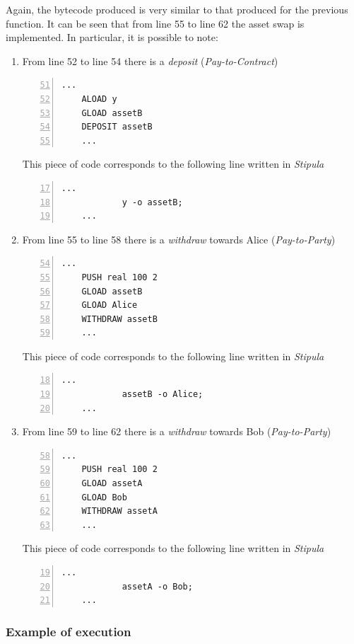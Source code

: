 Again, the bytecode produced is very similar to that produced for the previous function. It can be seen 
that from line 55 to line 62 the asset swap is implemented. In particular, it is possible to note:
\begin{enumerate}
  \item From line 52 to line 54 there is a \textit{deposit} (\textit{Pay-to-Contract})
  \begin{Verbatim}[numbers=left,xleftmargin=1cm,firstnumber=51,tabsize=2]
    ...
    ALOAD y
    GLOAD assetB
    DEPOSIT assetB
    ...
  \end{Verbatim}
  This piece of code corresponds to the following line written in \textit{Stipula}
  \begin{Verbatim}[numbers=left,xleftmargin=1cm,firstnumber=17,tabsize=2]
    ...
            y -o assetB;
    ...
  \end{Verbatim}
  \item From line 55 to line 58 there is a \textit{withdraw} towards Alice (\textit{Pay-to-Party})
  \begin{Verbatim}[numbers=left,xleftmargin=1cm,firstnumber=54,tabsize=2]
    ...
    PUSH real 100 2
    GLOAD assetB
    GLOAD Alice
    WITHDRAW assetB
    ...
  \end{Verbatim}
  This piece of code corresponds to the following line written in \textit{Stipula}
  \begin{Verbatim}[numbers=left,xleftmargin=1cm,firstnumber=18,tabsize=2]
    ...
            assetB -o Alice;
    ...
  \end{Verbatim}
  \item From line 59 to line 62 there is a \textit{withdraw} towards Bob (\textit{Pay-to-Party})
  \begin{Verbatim}[numbers=left,xleftmargin=1cm,firstnumber=58,tabsize=2]
    ...
    PUSH real 100 2
    GLOAD assetA
    GLOAD Bob
    WITHDRAW assetA
    ...
  \end{Verbatim}
  This piece of code corresponds to the following line written in \textit{Stipula}
  \begin{Verbatim}[numbers=left,xleftmargin=1cm,firstnumber=19,tabsize=2]
    ...
            assetA -o Bob;
    ...
  \end{Verbatim}
\end{enumerate}

\subsubsection{Example of execution}

